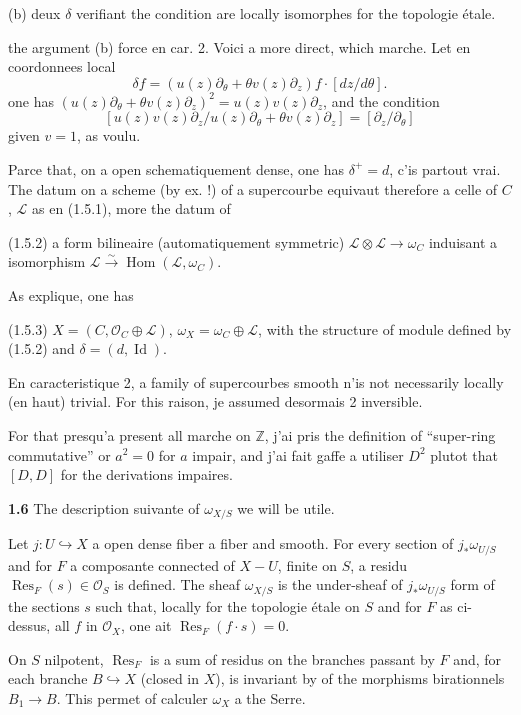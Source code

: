 \documentclass[11pt,a4paper]{article}
\theoremstyle{plain}
\theoremstyle{definition}
\DeclareMathOperator{\Hom}{Hom}
\DeclareMathOperator{\Res}{Res}
\DeclareMathOperator{\Id}{Id}
\begin{document}
(b) deux $\delta$ verifiant the condition are locally isomorphes for the topologie étale.

the argument (b) force en car. 2. Voici a more direct, which marche. Let en coordonnees local
\[
\delta f = (u(z)\partial_\theta + \theta v(z)\partial_z)f \cdot [dz/d\theta].
\]
one has $(u(z)\partial_\theta + \theta v(z)\partial_z)^2 = u(z)v(z)\partial_z$, and the condition
\[
[u(z)v(z)\partial_z / u(z)\partial_\theta + \theta v(z)\partial_z] = [\partial_z / \partial_\theta]
\]
given $v = 1$, as voulu.

\newpage

Parce that, on a open schematiquement dense, one has $\delta^+ = d$, c'is partout vrai. The datum on a scheme (by ex. !) of a supercourbe equivaut therefore a celle of $C$, $\mathcal{L}$ as en (1.5.1), more the datum of

\noindent (1.5.2) a form bilineaire (automatiquement symmetric) $\mathcal{L} \otimes \mathcal{L} \to \omega_C$ induisant a isomorphism $\mathcal{L} \xrightarrow{\sim} \Hom(\mathcal{L}, \omega_C)$.

As explique, one has

\noindent (1.5.3) $X = (C, \mathcal{O}_C \oplus \mathcal{L})$, $\omega_X = \omega_C \oplus \mathcal{L}$, with the structure of module defined by (1.5.2) and $\delta = (d, \Id)$.

En caracteristique 2, a family of supercourbes smooth n'is not necessarily locally (en haut) trivial. For this raison, je assumed desormais 2 inversible.

For that presqu'a present all marche on $\mathbb{Z}$, j'ai pris the definition of ``super-ring commutative'' or $a^2 = 0$ for $a$ impair, and j'ai fait gaffe a utiliser $D^2$ plutot that $[D,D]$ for the derivations impaires.

\medskip

\noindent \textbf{1.6} The description suivante of $\omega_{X/S}$ we will be utile.

Let $j : U \hookrightarrow X$ a open dense fiber a fiber and smooth. For every section of $j_*\omega_{U/S}$ and for $F$ a composante connected of $X-U$, finite on $S$, a residu $\Res_F(s) \in \mathcal{O}_S$ is defined. The sheaf $\omega_{X/S}$ is the under-sheaf of $j_*\omega_{U/S}$ form of the sections $s$ such that, locally for the topologie étale on $S$ and for $F$ as ci-dessus, all $f$ in $\mathcal{O}_X$, one ait $\Res_F(f \cdot s) = 0$.

On $S$ nilpotent, $\Res_F$ is a sum of residus on the branches passant by $F$ and, for each branche $B \hookrightarrow X$ (closed in $X$), is invariant by of the morphisms birationnels $B_1 \to B$. This permet of calculer $\omega_X$ a the Serre.
\end{document}
